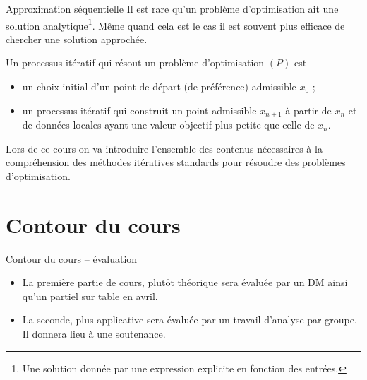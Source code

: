 \documentclass[aspectratio = 169]{beamer}
\begin{document}
\begin{frame}{Approximation séquentielle}
  Il est rare qu'un problème d'optimisation ait une solution
  analytique\footnote{Une solution donnée par une expression explicite
    en fonction des entrées.}. Même quand cela est le cas il est
  souvent plus efficace de chercher une solution approchée.

  Un processus itératif qui résout un problème d'optimisation $(P)$
  est
  \begin{itemize}
  \item<2-> un choix initial d'un point de départ (de préférence)
    admissible $x_0$ ;
  \item<3-> un processus itératif qui construit un point admissible
    $x_{n+1}$ à partir de $x_n$ et de données locales ayant une valeur
    objectif plus petite que celle de $x_n$.
  \end{itemize}
  \pause[4]
  Lors de ce cours on va introduire l'ensemble des contenus
  nécessaires à la compréhension des méthodes itératives standards
  pour résoudre des problèmes d'optimisation.
\end{frame}

\section{Contour du cours}

\begin{frame}{Contour du cours -- évaluation}
  \begin{itemize}
  \item
    La première partie de cours, plutôt théorique sera évaluée par un DM
    ainsi qu'un partiel sur table en avril.
  \item
    La seconde, plus applicative
    sera évaluée par un travail d'analyse par groupe. Il donnera lieu à
    une soutenance.
  \end{itemize}
\end{frame}
\end{document}
